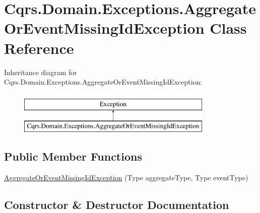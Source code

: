 \hypertarget{classCqrs_1_1Domain_1_1Exceptions_1_1AggregateOrEventMissingIdException}{}\section{Cqrs.\+Domain.\+Exceptions.\+Aggregate\+Or\+Event\+Missing\+Id\+Exception Class Reference}
\label{classCqrs_1_1Domain_1_1Exceptions_1_1AggregateOrEventMissingIdException}
Inheritance diagram for Cqrs.\+Domain.\+Exceptions.\+Aggregate\+Or\+Event\+Missing\+Id\+Exception\+:\begin{figure}[H]
\begin{center}
\leavevmode
\includegraphics[height=2.000000cm]{classCqrs_1_1Domain_1_1Exceptions_1_1AggregateOrEventMissingIdException}
\end{center}
\end{figure}
\subsection*{Public Member Functions}
\begin{DoxyCompactItemize}
\item 
\hyperlink{classCqrs_1_1Domain_1_1Exceptions_1_1AggregateOrEventMissingIdException_ac63e413557df17ed490a8b787e17d960_ac63e413557df17ed490a8b787e17d960}{Aggregate\+Or\+Event\+Missing\+Id\+Exception} (Type aggregate\+Type, Type event\+Type)
\end{DoxyCompactItemize}


\subsection{Constructor \& Destructor Documentation}
\mbox{\label{classCqrs_1_1Domain_1_1Exceptions_1_1AggregateOrEventMissingIdException_ac63e413557df17ed490a8b787e17d960_ac63e413557df17ed490a8b787e17d960}} 
